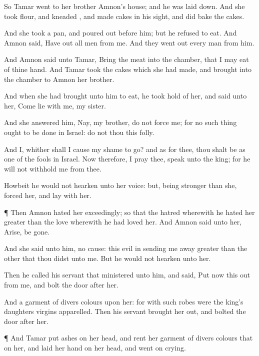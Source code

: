 {So
Tamar
went to her
brother
Amnon’s
house; and he was laid
down. And she
took
flour, and
kneaded
{}, and made
cakes in his
sight, and did
bake the
cakes.

And she
took a
pan, and poured
{}
out
before him; but he
refused to
eat. And
Amnon
said, Have
out all
men from me. And they went
out every
man from him.

And
Amnon
said unto
Tamar,
Bring the
meat into the
chamber, that I may
eat of thine
hand. And
Tamar
took the
cakes which she had
made, and
brought
{} into the
chamber to
Amnon her
brother.

And when she had
brought
{} unto him to
eat, he took
hold of her, and
said unto her,
Come
lie with me, my
sister.

And she
answered him, Nay, my
brother, do not
force me; for no such thing
ought to be
done in
Israel:
do not thou this
folly.

And I, whither shall I cause my
shame to
go? and as for thee, thou shalt be as
one of the
fools in
Israel. Now therefore, I pray thee,
speak unto the
king; for he will not
withhold me from thee.

Howbeit he
would not
hearken unto her
voice: but, being
stronger than she,
forced her, and
lay with her.


\par }{\PP {}¶ Then
Amnon
hated her
exceedingly; so that the
hatred wherewith he
hated her
{}
greater than the
love wherewith he had
loved her. And
Amnon
said unto her,
Arise, be
gone.

And she
said unto him,
{} no
cause: this
evil in sending me
away
{}
greater than the
other that thou
didst unto me. But he
would not
hearken unto her.

Then he
called his
servant that
ministered unto him, and
said,
Put now this
{}
out from me, and
bolt the
door
after her.

And
{} a
garment of divers
colours upon her: for with such
robes were the
king’s
daughters
{}
virgins
apparelled. Then his
servant
brought her
out, and
bolted the
door
after her.


\par }{\PP {}¶ And
Tamar
put
ashes on her
head, and
rent her
garment of divers
colours that
{} on her, and
laid her
hand on her
head, and
went
on
crying.

}
